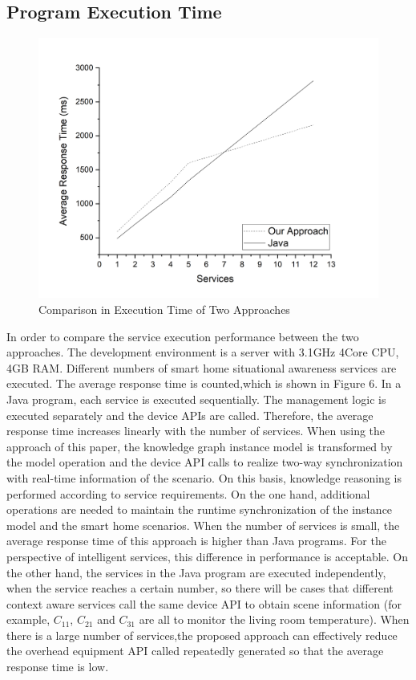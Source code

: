 \subsection{Program Execution Time}

\begin{figure}[h]
	\centering
	\includegraphics[width = .8\textwidth]{fig6.png}
	\caption{Comparison in Execution Time of Two Approaches}
\end{figure}

In order to compare the service execution performance between the two approaches. The development environment is a server with 3.1GHz 4Core CPU, 4GB RAM. Different numbers of smart home situational awareness services are executed. The average response time is counted,which is shown in Figure 6. In a Java program, each service is executed sequentially. The management logic is executed separately and the device APIs are called. Therefore, the average response time increases linearly with the number of services. When using the approach of this paper, the knowledge graph instance model is transformed by the model operation and the device API calls to realize two-way synchronization with real-time information of the scenario. On this basis, knowledge reasoning is performed according to service requirements. On the one hand, additional operations are needed to maintain the runtime synchronization of the instance model and the smart home scenarios. When the number of services is small, the average response time of this approach is higher than Java programs. For the perspective of intelligent services, this difference in performance is acceptable. On the other hand, the services in the Java program are executed independently, when the service reaches a certain number, so there will be cases that different context aware services call the same device API to obtain scene information (for example, $C_{11}$, $C_{21}$ and $C_{31}$ are all to monitor the living room temperature). When there is a large number of services,the proposed approach can effectively reduce the overhead equipment API called repeatedly generated so that the average response time is low.


